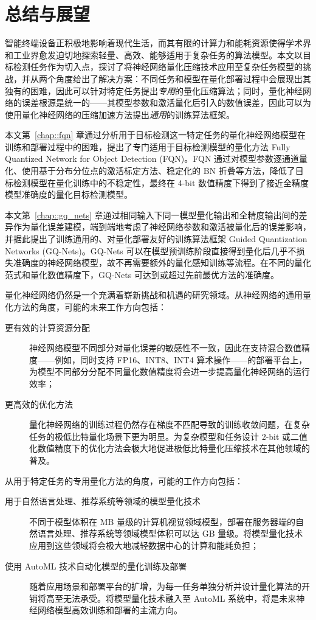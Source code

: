 \documentclass[
  fontset = source,
]{shtthesis}
\begin{document}
\chapter{总结与展望}
智能终端设备正积极地影响着现代生活，而其有限的计算力和能耗资源使得学术界和工业界愈发迫切地探索轻量、高效、能够适用于复杂任务的算法模型。本文以目标检测任务作为切入点，探讨了将神经网络量化压缩技术应用至复杂任务模型的挑战，并从两个角度给出了解决方案：不同任务和模型在量化部署过程中会展现出其独有的困难，因此可以针对特定任务提出\emph{专用}的量化压缩算法；同时，量化神经网络的误差根源是统一的——其模型参数和激活量化后引入的数值误差，因此可以为使用量化神经网络的压缩加速方法提出\emph{通用}的训练算法框架。

本文第~\ref{chap::fqn} 章通过分析用于目标检测这一特定任务的量化神经网络模型在训练和部署过程中的困难，提出了专门适用于目标检测模型的量化方法 Fully Quantized Network for Object Detection (FQN)。FQN 通过对模型参数逐通道量化、使用基于分布分位点的激活标定方法、稳定化的 BN 折叠等方法，降低了目标检测模型在量化训练中的不稳定性，最终在 4-bit 数值精度下得到了接近全精度模型准确度的量化目标检测模型。

本文第~\ref{chap::gq_nets} 章通过相同输入下同一模型量化输出和全精度输出间的差异作为量化误差建模，端到端地考虑了神经网络参数和激活被量化后的误差影响，并据此提出了训练通用的、对量化部署友好的训练算法框架 Guided Quantization Networks (GQ-Nets)。GQ-Nets 可以在模型预训练阶段直接得到量化后几乎不损失准确度的神经网络模型，故不再需要额外的量化感知训练等流程。在不同的量化范式和量化数值精度下，GQ-Nets 可达到或超过先前最优方法的准确度。

量化神经网络仍然是一个充满着崭新挑战和机遇的研究领域。从神经网络的通用量化方法的角度，可能的未来工作方向包括：
\begin{description}
  \item[更有效的计算资源分配] 神经网络模型不同部分对量化误差的敏感性不一致，因此在支持混合数值精度——例如，同时支持 FP16、INT8、INT4 算术操作——的部署平台上，为模型不同部分分配不同量化数值精度将会进一步提高量化神经网络的运行效率；
  \item[更高效的优化方法] 量化神经网络的训练过程仍然存在梯度不匹配导致的训练收敛问题，在复杂任务的极低比特量化场景下更为明显。为复杂模型和任务设计 2-bit 或二值化数值精度下的优化方法会极大地促进极低比特量化压缩技术在其他领域的普及。
\end{description}

从用于特定任务的专用量化方法的角度，可能的工作方向包括：
\begin{description}
  \item[用于自然语言处理、推荐系统等领域的模型量化技术] 不同于模型体积在 MB 量级的计算机视觉领域模型，部署在服务器端的自然语言处理、推荐系统等领域模型体积可以达 GB 量级。将模型量化技术应用到这些领域将会极大地减轻数据中心的计算和能耗负担；
  \item[使用 AutoML 技术自动化模型的量化训练及部署] 随着应用场景和部署平台的扩增，为每一任务单独分析并设计量化算法的开销将高至无法承受。将模型量化技术融入至 AutoML 系统中，将是未来神经网络模型高效训练和部署的主流方向。
\end{description}
\end{document}
